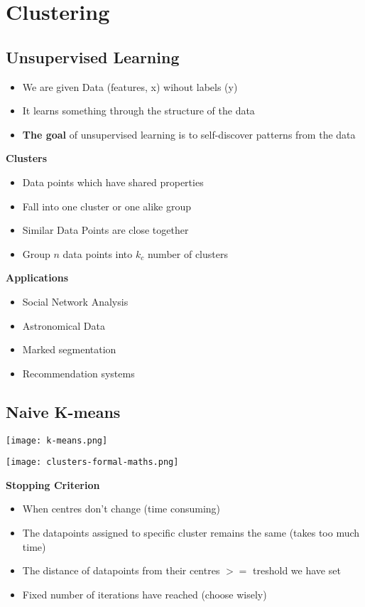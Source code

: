 \section{Clustering}
\subsection{Unsupervised Learning}
\begin{itemize}
    \item We are given Data (features, x) wihout labels (y)
    \item It learns something through the structure of the data
    \item \textbf{The goal} of unsupervised learning is to self-discover patterns from the data
\end{itemize}

\textbf{Clusters}
\begin{itemize}
    \item Data points which have shared properties
    \item Fall into one cluster or one alike group
    \item Similar Data Points are close together
    \item Group $n$ data points into $k_c$ number of clusters
\end{itemize}
\textbf{Applications}
\begin{itemize}
    \item Social Network Analysis
    \item Astronomical Data
    \item Marked segmentation
    \item Recommendation systems
\end{itemize}
\subsection{Naive K-means}
\texttt{[image: k-means.png]}

\texttt{[image: clusters-formal-maths.png]}

\textbf{Stopping Criterion}
\begin{itemize}
    \item When centres don't change (time consuming)
    \item The datapoints assigned to specific cluster remains the same (takes too much time)
    \item The distance of datapoints from their centres $>=$ treshold we have set
    \item Fixed number of iterations have reached (choose wisely)
\end{itemize}

